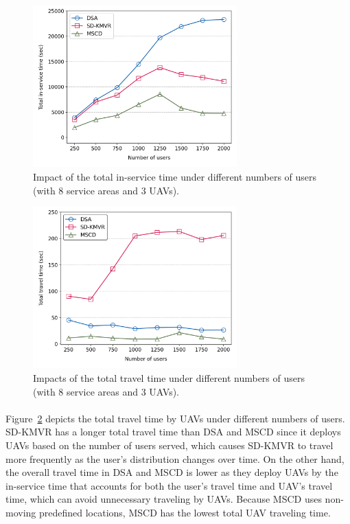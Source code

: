 \documentclass[a4paper,12pt]{report}
\begin{document}
\begin{figure} [h!]
    \centering
    \includegraphics[width=0.7\textwidth]{Figure 5.png}
    \caption{Impact of the total in-service time under different numbers of users (with 8 service areas and 3 UAVs).}
    \label{fig:Impact on Total In-service Time}
\end{figure}
\begin{figure} [h!]
    \centering
    \includegraphics[width=0.7\textwidth]{Figure 6.png}
    \caption{Impacts of the total travel time under different numbers of users (with 8 service areas and 3 UAVs).}
    \label{fig:Impact on total travel time}
\end{figure}

\paragraph{}
Figure~\ref{fig:Impact on total travel time} depicts the total travel time by UAVs under different numbers of users. SD-KMVR has a longer total travel time than DSA and MSCD since it deploys UAVs based on the number of users served, which causes SD-KMVR to travel more frequently as the user's distribution changes over time. On the other hand, the overall travel time in DSA and MSCD is lower as they deploy UAVs by the in-service time that accounts for both the user's travel time and UAV's travel time, which can avoid unnecessary traveling by UAVs. Because MSCD uses non-moving predefined locations, MSCD has the lowest total UAV traveling time.
\end{document}
